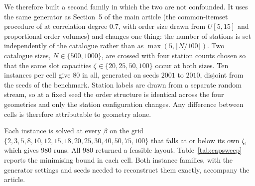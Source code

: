\documentclass[11pt]{article}
\begin{document}
We therefore built a second family in which the two are not confounded. It uses the same
generator as Section~5 of the main article (the common-itemset procedure of
\citet{zhang2019cie} at correlation degree $0.7$, with order size drawn from $U[5,15]$ and
proportional order volumes) and changes one thing: the number of stations is set independently
of the catalogue rather than as $\max(5,\lfloor N/100\rfloor)$. Two catalogue sizes,
$N\in\{500,1000\}$, are crossed with four station counts chosen so that the same slot
capacities $\zeta\in\{20,25,50,100\}$ occur at both sizes. Ten instances per cell give 80 in
all, generated on seeds $2001$ to $2010$, disjoint from the seeds of the benchmark. Station
labels are drawn from a separate random stream, so at a fixed seed the order structure is
identical across the four geometries and only the station configuration changes. Any difference
between cells is therefore attributable to geometry alone.

Each instance is solved at every $\beta$ on the grid
$\{2,3,5,8,10,12,15,18,20,25,30,40,50,75,100\}$ that falls at or below its own $\zeta$, which
gives 980 runs. All 980 returned a feasible layout. Table~\ref{tab:capsweep} reports the
minimising bound in each cell. Both instance families, with the generator settings and seeds
needed to reconstruct them exactly, accompany the article.
\end{document}
